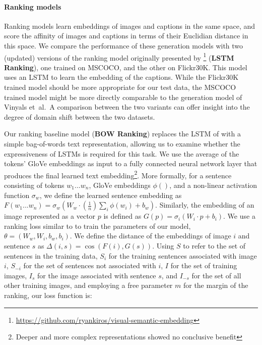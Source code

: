 \documentclass[11pt]{article}
\newcommand{\etal}{et~al.~}
\begin{document}
\paragraph{Ranking models}
Ranking models learn embeddings of images and captions in the same space, and score the affinity of images and captions in terms of their Euclidian distance in this space. 
We compare the performance of these generation models with two (updated) versions of  the ranking model originally presented by 
\footnote{\tiny \url{https://github.com/ryankiros/visual-semantic-embedding}} (\textbf{LSTM Ranking}), one trained on MSCOCO, and the other on Flickr30K. This model uses an LSTM to learn the embedding of the captions. While the Flickr30K trained model should be more appropriate for our test data, the MSCOCO trained model might be more directly comparable to the generation model of Vinyals \etal A comparison between the two variants can offer insight into the degree of domain shift between the two datasets.

Our ranking baseline model (\textbf{BOW Ranking}) replaces the LSTM of  with a simple bag-of-words text representation, allowing us to examine whether the expressiveness of LSTMs is required for this task.  We use the average of the tokens' GloVe embeddings \cite{pennington2014glove}  as input to a fully connected neural network layer that produces the final 
 learned text embedding\footnote{Deeper and more complex representations showed no
   conclusive benefit}.   More formally, for a sentence consisting of tokens $w_1... w_n$, GloVe embeddings $\phi()$, and a non-linear activation function $\sigma_w$, we define the learned sentence embedding as $F(w_1... w_n) = \sigma_w(W_w\cdot(\frac{1}{n})\sum_i{\phi(w_i)}+b_w)$. 
Similarly, the embedding of an image represented as a vector  $p$ is defined 
 as $G(p) = \sigma_i( W_i\cdot p+b_i)$. 
We use a ranking loss  similar to  to train the parameters of our model, $\theta = (W_w,W_i,b_w,b_i)$.
We define the distance of the embeddings of image $i$ and sentence $s$ as $\Delta(i,s) = \cos(F(i), G(s))$. Using $S$ to refer to the set of sentences in the training data, $S_i$ for the training sentences  associated with image $i$,  $S_{-i}$ for the set of sentences not associated with $i$, $I$ for the set of training images, $I_s$ for the image associated with sentence $s$, and $I_{-s}$ for the set of all  other training images, and employing a free parameter $m$ for the margin of the ranking, our  loss
 function is:
\end{document}
